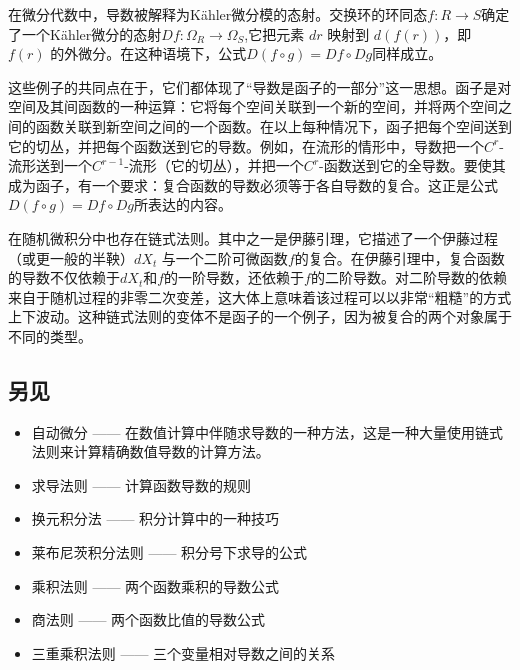 在微分代数中，导数被解释为Kähler微分模的态射。交换环的环同态$f : R \to S$确定了一个Kähler微分的态射$Df : \Omega_R \to \Omega_S$,它把元素 $dr$ 映射到 $d(f(r))$，即 $f(r)$ 的外微分。在这种语境下，公式$D(f \circ g) = Df \circ Dg
$同样成立。

这些例子的共同点在于，它们都体现了“导数是函子的一部分”这一思想。函子是对空间及其间函数的一种运算：它将每个空间关联到一个新的空间，并将两个空间之间的函数关联到新空间之间的一个函数。在以上每种情况下，函子把每个空间送到它的切丛，并把每个函数送到它的导数。例如，在流形的情形中，导数把一个$C^r$-流形送到一个$C^{r-1}$-流形（它的切丛），并把一个$C^r$-函数送到它的全导数。要使其成为函子，有一个要求：复合函数的导数必须等于各自导数的复合。这正是公式$D(f \circ g) = Df \circ Dg$所表达的内容。

在随机微积分中也存在链式法则。其中之一是伊藤引理，它描述了一个伊藤过程（或更一般的半鞅）$dX_t$ 与一个二阶可微函数$f$的复合。在伊藤引理中，复合函数的导数不仅依赖于$dX_t$和$f$的一阶导数，还依赖于$f$的二阶导数。对二阶导数的依赖来自于随机过程的非零二次变差，这大体上意味着该过程可以以非常“粗糙”的方式上下波动。这种链式法则的变体不是函子的一个例子，因为被复合的两个对象属于不同的类型。
\subsection{另见}
\begin{itemize}
\item 自动微分 —— 在数值计算中伴随求导数的一种方法，这是一种大量使用链式法则来计算精确数值导数的计算方法。
\item 求导法则 —— 计算函数导数的规则
\item 换元积分法 —— 积分计算中的一种技巧
\item 莱布尼茨积分法则 —— 积分号下求导的公式
\item 乘积法则 —— 两个函数乘积的导数公式
\item 商法则 —— 两个函数比值的导数公式
\item 三重乘积法则 —— 三个变量相对导数之间的关系
\end{itemize}
